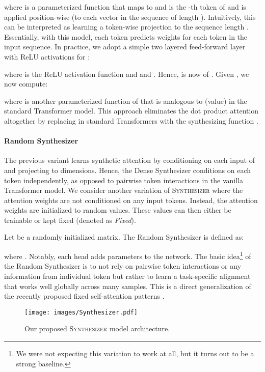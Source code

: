 \documentclass{article}
\begin{document}
where  is a parameterized function that maps  to  and  is the -th token of  and is applied position-wise (to each vector in the sequence of length ). Intuitively, this can be interpreted as learning a token-wise projection to the sequence length . Essentially, with this model, each token predicts weights for each token in the input sequence. In practice, we adopt a simple two layered feed-forward layer with ReLU activations for :

where  is the ReLU activation function and  and . Hence,  is now of . Given , we now compute:

where  is another parameterized function of  that is analogous to  (value) in the standard Transformer model. This approach eliminates the dot product attention  altogether by replacing   in standard Transformers with the synthesizing function . 

\paragraph{Random Synthesizer}
The previous variant learns synthetic attention by conditioning on each input of  and projecting to  dimensions. Hence, the Dense Synthesizer conditions on each token independently, as opposed to pairwise token interactions in the vanilla Transformer model. We consider another variation of \textsc{Synthesizer} where the attention weights are not conditioned on any input tokens. Instead, the attention weights are initialized to random values. These values can then either be trainable or kept fixed (denoted as \textit{Fixed}).

Let  be a randomly initialized matrix. The Random Synthesizer is defined as:

where . Notably, each head adds  parameters to the network. The basic idea\footnote{We were not expecting this variation to work at all, but it turns out to be a strong baseline.} of the Random Synthesizer is to not rely on pairwise token interactions or any information from individual token but rather to learn a task-specific alignment that works well globally across many samples. This is a direct generalization of the recently proposed fixed self-attention patterns \cite{raganato2020fixed}.

\begin{figure*}[t]
\centering
     \texttt{[image: images/Synthesizer.pdf]}
    \label{fig:architecture}
    \caption{Our proposed \textsc{Synthesizer} model architecture.}
\end{figure*}
\end{document}

